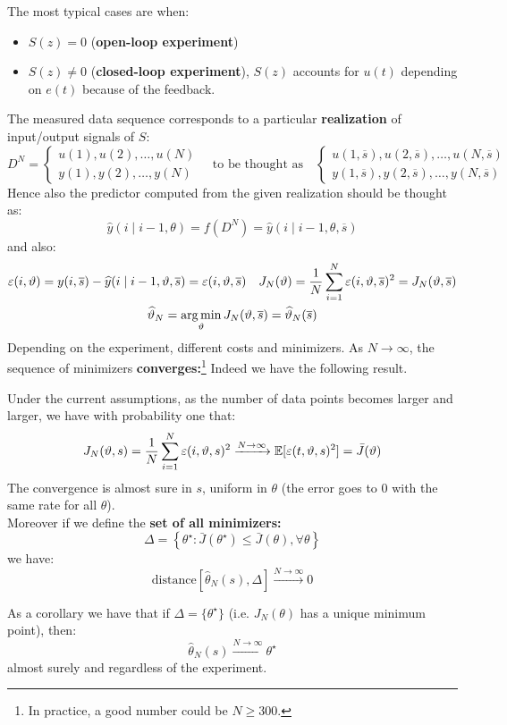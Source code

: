 The most typical cases are when:
\begin{itemize}
	\item $S(z)=0$ (\textbf{open-loop experiment})
	\item $S(z)\neq 0$ (\textbf{closed-loop experiment}), $S(z)$ accounts for $u(t)$ depending on $e(t)$ because of the feedback.
\end{itemize}
The measured data sequence corresponds to a particular \textbf{realization} of input/output signals of $S$:
\[
	D^{N}=
	\begin{cases}
	 	u(1),u(2),\ldots,u(N)\\
	 	y(1),y(2),\ldots,y(N)
	\end{cases}
	\quad
	\text{to be thought as}
	\quad
	\begin{cases}
	 	u(1,\overline{s}),u(2,\overline{s}),\ldots,u(N,\overline{s})\\
	 	y(1,\overline{s}),y(2,\overline{s}),\ldots,y(N,\overline{s})
	\end{cases}
\]
Hence also the predictor computed from the given realization should be thought as:
\[
	\hat{y}(i\mid i-1,\theta) = f(D^{N}) = \hat{y}(i\mid i-1,\theta,\overline{s})
\]
and also:
\begin{gather*}
	\varepsilon(i,\vartheta) = y(i,\overline{s}) - \widehat{y}(i\mid i-1,\vartheta,\overline{s}) = \varepsilon(i,\vartheta,\overline{s})
	\quad
	J_{N}(\vartheta) = \frac{1}{N}\sum_{i=1}^{N} \varepsilon(i,\vartheta,\overline{s})^2 = J_{N}(\vartheta,\overline{s})\\
	\widehat{\vartheta}_{N} = \operatorname*{arg\,min}_{\vartheta} J_{N}(\vartheta,\overline{s}) = \widehat{\vartheta}_{N}(\overline{s})
\end{gather*}
Depending on the experiment, different costs and minimizers. As $N\to \infty$, the sequence of minimizers \textbf{converges:}\footnote{In practice, a good number could be $N\geq 300$.}
Indeed we have the following result.
\begin{theorem}
	Under the current assumptions, as the number of data points becomes larger and larger, we have with probability one that:
	\[
		J_{N}(\vartheta,s) = \frac{1}{N}\sum_{i=1}^{N} \varepsilon(i,\vartheta,s)^2 \xrightarrow{N\to\infty} \mathbb{E}[\varepsilon(t,\vartheta,s)^2] = \bar{J}(\vartheta)
	\]
	The convergence is almost sure in $s$, uniform in $\theta$ (the error goes to $0$ with the same rate for all $\theta$).\\
	Moreover if we define the \textbf{set of all minimizers:}
	\[
		\Delta = \left\{ \theta ^{\star} : \bar{J}(\theta ^{\star})\leq \bar{J}(\theta),\forall \theta  \right\}
	\]
	we have:
	\[
		\text{distance}[\hat{\theta}_{N}(s), \Delta]\xrightarrow{N\to\infty} 0
	\]
\end{theorem}
As a corollary we have that if $\Delta =\{\theta^{\star}\}$ (i.e. $J_{N}(\theta)$ has a unique minimum point), then:
\[
	\hat{\theta}_{N}(s) \xrightarrow{N\to\infty} \theta ^{\star} 
\]
almost surely and regardless of the experiment.

